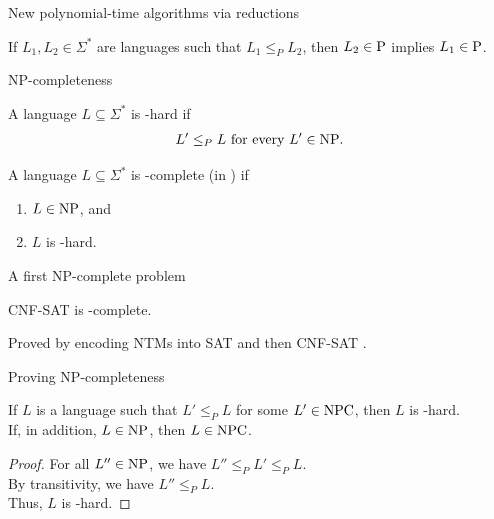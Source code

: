 \begin{frame}{New polynomial-time algorithms via reductions}

	\begin{lemma}
		If $L_1, L_2 \in \Sigma^*$ are languages such that $L_1 \le_P L_2$, then $L_2 \in \P$ implies $L_1\in \P$.
	\end{lemma}

\end{frame}


\begin{frame}{NP-completeness}
	\begin{definition}[NP-hard]
		A language $L \subseteq \Sigma^*$ is \alert{\NP-hard} if
		\begin{align*}
			L' \leq_P L \text{ for every } L'\in \NP.
		\end{align*}
	\end{definition}

	\begin{definition}[NP-complete]
		A language $L \subseteq \Sigma^*$ is \alert{\NP-complete} (in \NPC) if
		\begin{enumerate}
			\item $L \in \NP$, and
			\item $L$ is \NP-hard.
		\end{enumerate}
	\end{definition}
\end{frame}


\begin{frame}{A first NP-complete problem}
	\begin{theorem}
		CNF-SAT is \NP-complete.
	\end{theorem}
	Proved by encoding NTMs into SAT \cite{Cook71,Levin73} and then CNF-SAT \cite{Karp72}.
\end{frame}


\begin{frame}{Proving NP-completeness}
	\begin{lemma}
		If $L$ is a language such that $L' \le_P L$ for some $L' \in \NPC$, then $L$ is \NP-hard.\\
		If, in addition, $L\in \NP$, then $L\in \NPC$.
	\end{lemma}
	\pause
	\begin{proof}
		For all $L''\in \NP$, we have $L'' \le_P L' \le_P L$.\\
		By transitivity, we have $L'' \le_P L$.\\
		Thus, $L$ is \NP-hard.
	\end{proof}
\end{frame}



